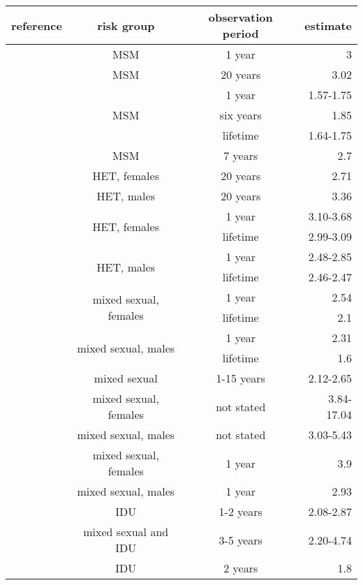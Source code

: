 \begin{tabular}{cccr}
  reference & risk group & observation period & estimate \\
  \hline
  \textcite{colgate1989risk} & MSM & 1 year & 3 \\
  \textcite{clemenccon2015statistical} & MSM & 20 years & 3.02 \\
  \multirow{3}{*}{\textcite{schneeberger2004scale}} & 
    \multirow{3}{*}{MSM} & 1 year & 1.57-1.75 \\
  & & six years & 1.85 \\
  & & lifetime & 1.64-1.75 \\
  \textcite{brown2011transmission} & MSM & 7 years & 2.7 \\
  \hline
  \multirow{2}{*}{\textcite{clemenccon2015statistical}} & HET, females & 20 years & 2.71 \\
  & HET, males & 20 years & 3.36 \\
  \multirow{4}{*}{\textcite{schneeberger2004scale}} & 
    \multirow{2}{*}{HET, females} & 1 year & 3.10-3.68 \\
  & & lifetime & 2.99-3.09 \\
  & \multirow{2}{*}{HET, males} & 1 year & 2.48-2.85 \\
  & & lifetime & 2.46-2.47 \\
  \multirow{4}{*}{\textcite{liljeros2001web}} & 
    \multirow{2}{*}{mixed sexual, females} & 1 year & 2.54 \\
  & & lifetime & 2.1 \\
  & \multirow{2}{*}{mixed sexual, males} & 1 year & 2.31 \\
  & & lifetime & 1.6 \\
  \textcite{rothenberg2007large} & mixed sexual & 1-15 years & 2.12-2.65 \\
  \multirow{2}{*}{\textcite{jones2003assessment}} & mixed sexual, females 
    & not stated & 3.84-17.04 \\
  & mixed sexual, males & not stated & 3.03-5.43 \\
  \multirow{2}{*}{\textcite{latora2006network}} & mixed sexual, females & 1 year & 3.9 \\
  & mixed sexual, males & 1 year & 2.93 \\
  \hline
  \multirow{2}{*}{\textcite{rothenberg2007large}} & IDU & 1-2 years & 2.08-2.87 \\
  & mixed sexual and IDU & 3-5 years & 2.20-4.74 \\
  \textcite{drombrowski2013topological} & IDU & 2 years & 1.8 \\
  \hline
\end{tabular}
